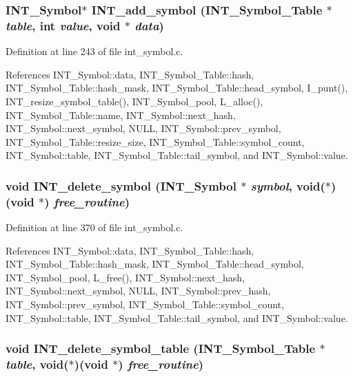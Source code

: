 \subsubsection{\setlength{\rightskip}{0pt plus 5cm}\bf{INT\_\-Symbol}$\ast$ INT\_\-add\_\-symbol (\bf{INT\_\-Symbol\_\-Table} $\ast$ {\em table}, int {\em value}, void $\ast$ {\em data})}\label{int__symbol_8h_ddfe548700f0b7b030b45cb5fe1cdf67}




Definition at line 243 of file int\_\-symbol.c.

References INT\_\-Symbol::data, INT\_\-Symbol\_\-Table::hash, INT\_\-Symbol\_\-Table::hash\_\-mask, INT\_\-Symbol\_\-Table::head\_\-symbol, I\_\-punt(), INT\_\-resize\_\-symbol\_\-table(), INT\_\-Symbol\_\-pool, L\_\-alloc(), INT\_\-Symbol\_\-Table::name, INT\_\-Symbol::next\_\-hash, INT\_\-Symbol::next\_\-symbol, NULL, INT\_\-Symbol::prev\_\-symbol, INT\_\-Symbol\_\-Table::resize\_\-size, INT\_\-Symbol\_\-Table::symbol\_\-count, INT\_\-Symbol::table, INT\_\-Symbol\_\-Table::tail\_\-symbol, and INT\_\-Symbol::value.
\subsubsection{\setlength{\rightskip}{0pt plus 5cm}void INT\_\-delete\_\-symbol (\bf{INT\_\-Symbol} $\ast$ {\em symbol}, void($\ast$)(void $\ast$) {\em free\_\-routine})}\label{int__symbol_8h_84cc47e8a94e9d12339fe6824c406c6e}




Definition at line 370 of file int\_\-symbol.c.

References INT\_\-Symbol::data, INT\_\-Symbol\_\-Table::hash, INT\_\-Symbol\_\-Table::hash\_\-mask, INT\_\-Symbol\_\-Table::head\_\-symbol, INT\_\-Symbol\_\-pool, L\_\-free(), INT\_\-Symbol::next\_\-hash, INT\_\-Symbol::next\_\-symbol, NULL, INT\_\-Symbol::prev\_\-hash, INT\_\-Symbol::prev\_\-symbol, INT\_\-Symbol\_\-Table::symbol\_\-count, INT\_\-Symbol::table, INT\_\-Symbol\_\-Table::tail\_\-symbol, and INT\_\-Symbol::value.
\subsubsection{\setlength{\rightskip}{0pt plus 5cm}void INT\_\-delete\_\-symbol\_\-table (\bf{INT\_\-Symbol\_\-Table} $\ast$ {\em table}, void($\ast$)(void $\ast$) {\em free\_\-routine})}\label{int__symbol_8h_c7eeab5d805b089e062bb7e6204ddbf0}




